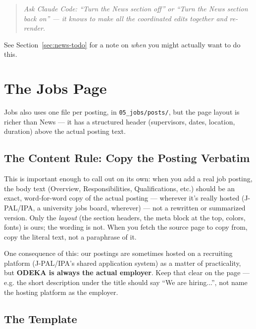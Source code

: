\documentclass[11pt]{article}
\newcommand{\term}[1]{\textbf{#1}}
\newcommand{\file}[1]{\texttt{#1}}
\begin{document}
\begin{quote}
\textit{Ask Claude Code: ``Turn the News section off'' or ``Turn the
News section back on'' --- it knows to make all the coordinated edits
together and re-render.}
\end{quote}

See Section~\ref{sec:news-todo} for a note on \emph{when} you might
actually want to do this.

\section{The Jobs Page}
\label{sec:jobs-page}

Jobs also uses one file per posting, in \file{05\_jobs/posts/}, but the
page layout is richer than News --- it has a structured header
(supervisors, dates, location, duration) above the actual posting text.

\subsection{The Content Rule: Copy the Posting Verbatim}

This is important enough to call out on its own: when you add a real
job posting, the body text (Overview, Responsibilities, Qualifications,
etc.) should be an exact, word-for-word copy of the actual posting
--- wherever it's really hosted (J-PAL/IPA, a university jobs board,
wherever) --- not a rewritten or summarized version. Only the
\emph{layout} (the section headers, the meta block at the top, colors,
fonts) is ours; the wording is not. When you fetch the source page to
copy from, copy the literal text, not a paraphrase of it.

One consequence of this: our postings are sometimes hosted on a
recruiting platform (J-PAL/IPA's shared application system) as a matter
of practicality, but \term{ODEKA is always the actual employer}. Keep
that clear on the page --- e.g. the short description under the title
should say ``We are hiring...'', not name the hosting platform as the
employer.

\subsection{The Template}
\end{document}
